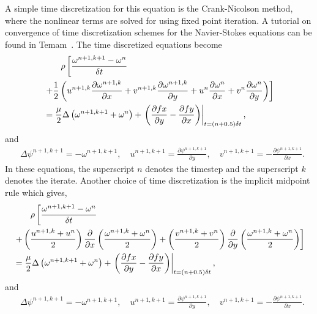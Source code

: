 A simple time discretization for this equation is the Crank-Nicolson method, where the nonlinear terms are solved for using fixed point iteration. A tutorial on convergence of time discretization schemes for the Navier-Stokes equations can be found in Temam~\cite{Tem01}. The time discretized equations become
\begin{align} \label{eq:Ns2dStrVorACn}
&{}\hspace{2em}\rho\left[\frac{\omega^{n+1,k+1}-\omega^n}{\delta t} \right.
\\&{}\left.+\frac{1}{2} \left( u^{n+1,k}\frac{\partial \omega^{n+1,k}}{\partial x} + v^{n+1,k}\frac{\partial \omega^{n+1,k} }{\partial y} 
+ u^{n}\frac{\partial \omega^{n}}{\partial x} + v^{n}\frac{\partial \omega^{n} }{\partial y} \right)\right] \notag
\\&{}=\frac{\mu}{2}\Delta\left(\omega^{n+1,k+1}+\omega^n\right) + \left.\left(\frac{\partial fx}{\partial y}-\frac{\partial fy}{\partial x} \right)\right\rvert_{t=(n+0.5)\delta t},\notag
\end{align}
and
\begin{align} \label{eq:Ns2dStrVorBCn}
&{}\Delta \psi^{n+1,k+1} = -\omega^{n+1,k+1}, \quad u^{n+1,k+1}=\frac{\partial \psi^{n+1,k+1}}{\partial y}, \quad v^{n+1,k+1}=-\frac{\partial \psi^{n+1,k+1}}{\partial x}.
\end{align}
In these equations, the superscript $n$ denotes the timestep and the superscript $k$ denotes the iterate. Another choice of time discretization is the implicit midpoint rule which gives,
\begin{align} \label{eq:Ns2dStrVorAimr}
&{}\hspace{2em}\rho\left[\frac{\omega^{n+1,k+1}-\omega^n}{\delta t} \right.
\\&{}\left.+ \left(\frac{u^{n+1,k}+u^n}{2}\right)\frac{\partial}{\partial x}\left(\frac{\omega^{n+1,k}+\omega^n}{2}\right) + \left(\frac{v^{n+1,k}+v^n}{2}\right)\frac{\partial}{\partial y}\left(\frac{ \omega^{n+1,k} +\omega^n}{2}\right)\right] \notag
\\&{}=\frac{\mu}{2}\Delta\left(\omega^{n+1,k+1}+\omega^n\right) + \left.\left(\frac{\partial fx}{\partial y}-\frac{\partial fy}{\partial x} \right)\right\rvert_{t=(n+0.5)\delta t},\notag
\end{align}
and
\begin{align} \label{eq:Ns2dStrVorBimr}
&{}\Delta \psi^{n+1,k+1} = -\omega^{n+1,k+1}, \quad u^{n+1,k+1}=\frac{\partial \psi^{n+1,k+1}}{\partial y}, \quad v^{n+1,k+1}=-\frac{\partial \psi^{n+1,k+1}}{\partial x}.
\end{align}

